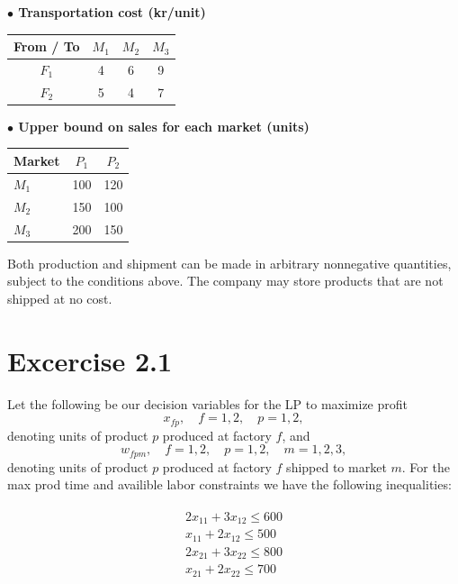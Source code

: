 \documentclass{assignment}
\begin{document}
\textbf{$\bullet$ Transportation cost (kr/unit)}

\begin{center}
\begin{tabular}{c|ccc}
\toprule
From / To & $M_1$ & $M_2$ & $M_3$ \\
\midrule
$F_1$     & 4     & 6     & 9     \\
$F_2$     & 5     & 4     & 7     \\
\bottomrule
\end{tabular}
\end{center}

\textbf{$\bullet$ Upper bound on sales for each market (units)}

\begin{center}
\begin{tabular}{lcc}
\toprule
Market & $P_1$ & $P_2$ \\
\midrule
$M_1$  & 100   & 120   \\
$M_2$  & 150   & 100   \\
$M_3$  & 200   & 150   \\
\bottomrule
\end{tabular}
\end{center}

Both production and shipment can be made in arbitrary nonnegative quantities, subject to the conditions above. The company may store products that are not shipped at no cost.
\section{Excercise 2.1}
Let the following be our decision variables for the LP to maximize profit\\
\[
    x_{fp}, \quad f = 1,2, \quad p = 1,2,
    \]
    denoting units of product $p$ produced at factory $f$, and
    \[
    w_{fpm}, \quad f = 1,2, \quad p = 1,2, \quad m = 1,2,3,
    \]
denoting units of product $p$ produced at factory $f$ shipped to market $m$.
For the max prod time and availible labor constraints we have the following inequalities:


\begin{gather*}
\begin{aligned}
    2x_{11} + 3x_{12} \leq 600 \\
    x_{11}+ 2x_{12} \leq 500 \\
    2x_{21} + 3x_{22} \leq 800 \\
    x_{21} + 2x_{22} \leq 700
\end{aligned} \\
\end{gather*}
\end{document}
